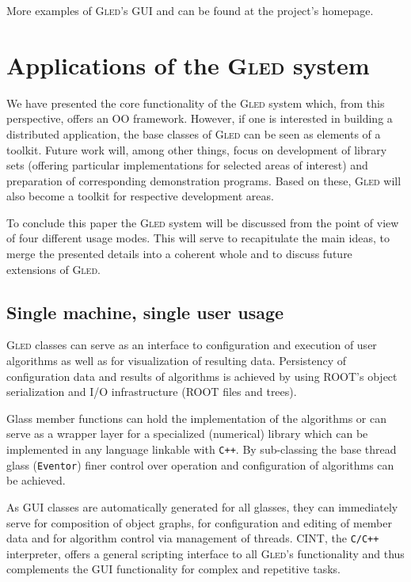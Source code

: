 \documentclass[final]{siamltex}
\def\gled{\textsc{Gled}\xspace}
\def\smalltt#1{{\small\texttt{#1}}}
\begin{document}
More examples of \gled's GUI and can be found at the
project's homepage\cite{gled.org}.

\section{Applications of the \gled system}

We have presented the core functionality of the \gled system which,
from this perspective, offers an OO framework. However, if one is
interested in building a distributed application, the base classes of
\gled can be seen as elements of a toolkit. Future work will, among
other things, focus on development of library sets (offering
particular implementations for selected areas of interest) and
preparation of corresponding demonstration programs. Based on these,
\gled will also become a toolkit for respective development areas.

To conclude this paper the \gled system will be discussed from the point
of view of four different usage modes. This will serve to recapitulate
the main ideas, to merge the presented details into a coherent whole
and to discuss future extensions of \gled.

\subsection{Single machine, single user usage}

\gled classes can serve as an interface to configuration and execution
of user algorithms as well as for visualization of resulting data.
Persistency of configuration data and results of algorithms is
achieved by using ROOT's object serialization and I/O infrastructure
(ROOT files and trees).

Glass member functions can hold the implementation of the algorithms or
can serve as a wrapper layer for a specialized (numerical) library
which can be implemented in any language linkable with \smalltt{C++}.
By sub-classing the base thread glass (\smalltt{Eventor}) finer
control over operation and configuration of algorithms can be
achieved.

As GUI classes are automatically generated for all glasses, they can
immediately serve for composition of object graphs, for configuration
and editing of member data and for algorithm control via management of
threads. CINT, the \smalltt{C/C++} interpreter, offers a general
scripting interface to all \gled's functionality and thus
complements the GUI functionality for complex and repetitive tasks.
\end{document}
